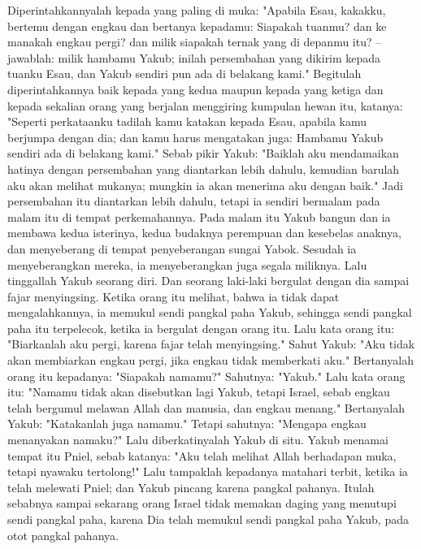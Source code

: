 \begin{biblechapter}
\verse Diperintahkannyalah kepada yang paling di muka: "Apabila Esau, kakakku, bertemu dengan engkau dan bertanya kepadamu: Siapakah tuanmu? dan ke manakah engkau pergi? dan milik siapakah ternak yang di depanmu itu? --
\verse jawablah: milik hambamu Yakub; inilah persembahan yang dikirim kepada tuanku Esau, dan Yakub sendiri pun ada di belakang kami."
\verse Begitulah diperintahkannya baik kepada yang kedua maupun kepada yang ketiga dan kepada sekalian orang yang berjalan menggiring kumpulan hewan itu, katanya: "Seperti perkataanku tadilah kamu katakan kepada Esau, apabila kamu berjumpa dengan dia;
\verse dan kamu harus mengatakan juga: Hambamu Yakub sendiri ada di belakang kami." Sebab pikir Yakub: "Baiklah aku mendamaikan hatinya dengan persembahan yang diantarkan lebih dahulu, kemudian barulah aku akan melihat mukanya; mungkin ia akan menerima aku dengan baik."
\verse Jadi persembahan itu diantarkan lebih dahulu, tetapi ia sendiri bermalam pada malam itu di tempat perkemahannya.
 Pada malam itu Yakub bangun dan ia membawa kedua isterinya, kedua budaknya perempuan dan kesebelas anaknya, dan menyeberang di tempat penyeberangan sungai Yabok.
\verse Sesudah ia menyeberangkan mereka, ia menyeberangkan juga segala miliknya.
\verse Lalu tinggallah Yakub seorang diri. Dan seorang laki-laki bergulat dengan dia sampai fajar menyingsing.
\verse Ketika orang itu melihat, bahwa ia tidak dapat mengalahkannya, ia memukul sendi pangkal paha Yakub, sehingga sendi pangkal paha itu terpelecok, ketika ia bergulat dengan orang itu.
\verse Lalu kata orang itu: "Biarkanlah aku pergi, karena fajar telah menyingsing." Sahut Yakub: "Aku tidak akan membiarkan engkau pergi, jika engkau tidak memberkati aku."
\verse Bertanyalah orang itu kepadanya: "Siapakah namamu?" Sahutnya: "Yakub."
\verse Lalu kata orang itu: "Namamu tidak akan disebutkan lagi Yakub, tetapi Israel, sebab engkau telah bergumul melawan Allah dan manusia, dan engkau menang."
\verse Bertanyalah Yakub: "Katakanlah juga namamu." Tetapi sahutnya: "Mengapa engkau menanyakan namaku?" Lalu diberkatinyalah Yakub di situ.
\verse Yakub menamai tempat itu Pniel, sebab katanya: "Aku telah melihat Allah berhadapan muka, tetapi nyawaku tertolong!"
\verse Lalu tampaklah kepadanya matahari terbit, ketika ia telah melewati Pniel; dan Yakub pincang karena pangkal pahanya.
\verse Itulah sebabnya sampai sekarang orang Israel tidak memakan daging yang menutupi sendi pangkal paha, karena Dia telah memukul sendi pangkal paha Yakub, pada otot pangkal pahanya.
\end{biblechapter}

